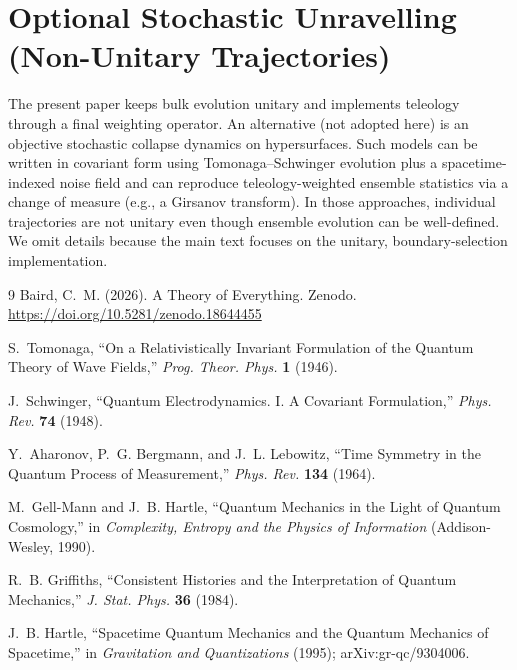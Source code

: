 \documentclass[reprint,amsmath,amssymb,aps,showkeys]{revtex4-2}
\begin{document}
\appendix
\section{Optional Stochastic Unravelling (Non-Unitary Trajectories)}
The present paper keeps bulk evolution unitary and implements teleology through a final weighting operator. An alternative (not adopted here) is an objective stochastic collapse dynamics on hypersurfaces. Such models can be written in covariant form using Tomonaga--Schwinger evolution plus a spacetime-indexed noise field and can reproduce teleology-weighted ensemble statistics via a change of measure (e.g., a Girsanov transform). In those approaches, individual trajectories are not unitary even though ensemble evolution can be well-defined. We omit details because the main text focuses on the unitary, boundary-selection implementation.

\begin{thebibliography}{9}
Baird, C.~M. (2026). A Theory of Everything. Zenodo. \url{https://doi.org/10.5281/zenodo.18644455}

S.~Tomonaga, ``On a Relativistically Invariant Formulation of the Quantum Theory of Wave Fields,'' \emph{Prog. Theor. Phys.} \textbf{1} (1946).

J.~Schwinger, ``Quantum Electrodynamics. I. A Covariant Formulation,'' \emph{Phys. Rev.} \textbf{74} (1948).

Y.~Aharonov, P.~G. Bergmann, and J.~L. Lebowitz, ``Time Symmetry in the Quantum Process of Measurement,'' \emph{Phys. Rev.} \textbf{134} (1964).

M.~Gell-Mann and J.~B. Hartle, ``Quantum Mechanics in the Light of Quantum Cosmology,'' in \emph{Complexity, Entropy and the Physics of Information} (Addison-Wesley, 1990).

R.~B. Griffiths, ``Consistent Histories and the Interpretation of Quantum Mechanics,'' \emph{J. Stat. Phys.} \textbf{36} (1984).

J.~B. Hartle, ``Spacetime Quantum Mechanics and the Quantum Mechanics of Spacetime,'' in \emph{Gravitation and Quantizations} (1995); arXiv:gr-qc/9304006.
\end{thebibliography}
\end{document}
